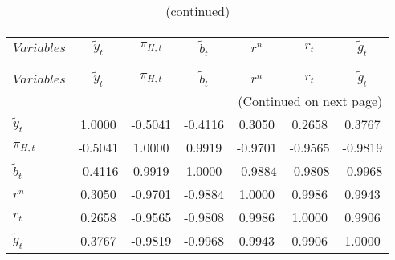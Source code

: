  
\begin{center}
\begin{longtable}{lcccccc} 
\caption{MATRIX OF CORRELATIONS}\\
 \label{Table:th_corr_matrix}\\
\toprule 
$Variables        $	 & 	 $   {\tilde{y}_{t}}$	 & 	 $       {\pi_{H,t}}$	 & 	 $     \tilde{b}_{t}$	 & 	 $            {r^{n}}$	 & 	 $            {r_{t}}$	 & 	 $     \tilde{g}_{t}$\\
\midrule \endfirsthead 
\caption{(continued)}\\
 \toprule \\ 
$Variables        $	 & 	 $   {\tilde{y}_{t}}$	 & 	 $       {\pi_{H,t}}$	 & 	 $     \tilde{b}_{t}$	 & 	 $            {r^{n}}$	 & 	 $            {r_{t}}$	 & 	 $     \tilde{g}_{t}$\\
\midrule \endhead 
\midrule \multicolumn{7}{r}{(Continued on next page)} \\ \bottomrule \endfoot 
\bottomrule \endlastfoot 
${\tilde{y}_{t}}  $	 & 	             1.0000	 & 	            -0.5041	 & 	            -0.4116	 & 	             0.3050	 & 	             0.2658	 & 	             0.3767 \\ 
${\pi_{H,t}}      $	 & 	            -0.5041	 & 	             1.0000	 & 	             0.9919	 & 	            -0.9701	 & 	            -0.9565	 & 	            -0.9819 \\ 
$\tilde{b}_{t}    $	 & 	            -0.4116	 & 	             0.9919	 & 	             1.0000	 & 	            -0.9884	 & 	            -0.9808	 & 	            -0.9968 \\ 
${r^{n}}          $	 & 	             0.3050	 & 	            -0.9701	 & 	            -0.9884	 & 	             1.0000	 & 	             0.9986	 & 	             0.9943 \\ 
${r_{t}}          $	 & 	             0.2658	 & 	            -0.9565	 & 	            -0.9808	 & 	             0.9986	 & 	             1.0000	 & 	             0.9906 \\ 
$\tilde{g}_{t}    $	 & 	             0.3767	 & 	            -0.9819	 & 	            -0.9968	 & 	             0.9943	 & 	             0.9906	 & 	             1.0000 \\ 
\end{longtable}
 \end{center}

